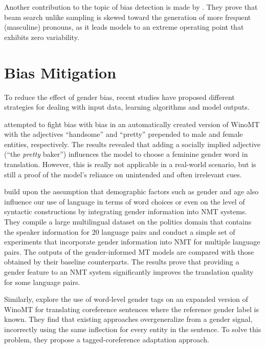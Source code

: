 Another contribution to the topic of bias detection is made by \citet{roberts2020decoding}. They prove that beam search unlike sampling is skewed toward the generation of more frequent (masculine) pronouns, as it leads models to an extreme operating point that exhibits zero variability.

\section{Bias Mitigation}
\label{sec:Background:Bias_Mitigation}

To reduce the effect of gender bias, recent studies have proposed different strategies for dealing with input data, learning algorithms and model outputs. 

\citet{Stanovsky_2019} attempted to fight bias with bias in an automatically created version of WinoMT with the adjectives “handsome” and “pretty” prepended to male and female entities, respectively. The results revealed that adding a socially implied adjective (“the \textit{pretty} baker”) influences the model to choose a feminine gender word in translation. However, this is really not applicable in a real-world scenario, but is still a proof of the model’s reliance on unintended and often irrelevant cues.

\citet{Vanmassenhove_2018} build upon the assumption that demographic factors such as gender and age also influence our use of language in terms of word choices or even on the level of syntactic constructions by integrating gender information into NMT systems. They compile a large multilingual dataset on the politics domain that contains the speaker information for 20 language pairs and conduct a simple set of experiments that incorporate gender information into NMT for multiple language pairs. The outputs of the gender-informed MT models are compared with those obtained by their baseline counterparts. The results prove that providing a gender feature to an NMT system significantly improves the translation quality for some language pairs. 

Similarly, \citet{Saunders_2020_coreference} explore the use of word-level gender tags on an expanded version of WinoMT for translating coreference sentences where the reference gender label is known. They find that existing approaches overgeneralize from a gender signal, incorrectly using the same inflection for every entity in the sentence. To solve this problem, they propose a tagged-coreference adaptation approach.

